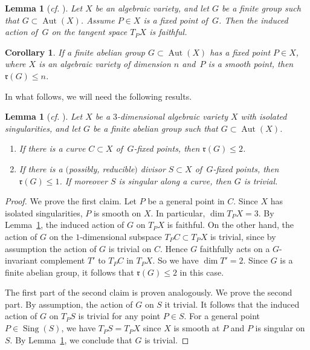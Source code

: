 \documentclass[10pt,a4paper]{article}
\newtheorem{corollary}[thm]{Corollary}
\newtheorem{lem}[thm]{Lemma}
\theoremstyle{definition}
\theoremstyle{remark}
\DeclareMathOperator{\Aut}{Aut}
\DeclareMathOperator{\Sing}{Sing}
\begin{document}
\begin{lem}[\textit{cf.} {\cite[Lemma 4]{Po14}}]
\label{lem-faithful-action}
Let $X$ be an algebraic variety, and let $G$ be a finite group such that $G\subset \Aut(X)$. Assume $P\in X$ is a fixed point of\, $G$.  Then the induced action of\, $G$ on the tangent space $T_P X$ is faithful.
\end{lem}

\begin{corollary}
\label{cor-faithful-action}
If a finite abelian group $G\subset \Aut(X)$ has a fixed point $P\in X$, where $X$ is an algebraic variety of dimension $n$ and~$P$ is a smooth point, then $\mathfrak{r}(G)\leq n$.
\end{corollary}

In what follows, we will need the following results. 

\begin{lem}[\textit{cf.} {\cite[Lemma 2.6]{Pr11}}]
\label{lem-fixed-curve-surface}
Let $X$ be a $3$-dimensional algebraic variety $X$ with isolated singularities, and let $G$ be a finite abelian group such that $G\subset \Aut(X)$.
\begin{enumerate}
\item\label{lfcs-1} 
If there is a curve $C\subset X$ of\, $G$-fixed points, then $\mathfrak{r}(G) \leq 2$.
\item\label{lfcs-2} 
If there is a $($possibly, reducible$)$ divisor $S\subset X$ of\, $G$-fixed points, then $\mathfrak{r}(G)\leq 1$.  If moreover $S$ is singular along a curve, then $G$ is trivial.
\end{enumerate}
\end{lem}

\begin{proof}
We prove the first claim. Let $P$ be a general point in $C$. Since $X$ has isolated singularities, $P$ is smooth on $X$. In particular, $\dim T_{P}X=3$. By Lemma~\ref{lem-faithful-action}, the induced action of $G$ on $T_{P}X$ is faithful. On the other hand, the action of $G$ on the $1$-dimensional subspace $T_P C \subset T_{P}X$ is trivial, since by assumption the action of $G$ is trivial on $C$. Hence $G$ faithfully acts on a $G$-invariant complement $T'$ to $T_P C$ in $T_P X$. So we have $\dim T'=2$. Since $G$ is a finite abelian group, it follows that $\mathfrak{r}(G)\leq 2$ in this case.  

The first part of the second claim is proven analogously. We prove the second part.  By assumption, the action of $G$ on $S$ it trivial. It follows that the induced action of $G$ on $T_P S$ is trivial for any point $P\in S$. For a general point $P\in \Sing(S)$, we have $T_P S=T_P X$ since $X$ is smooth at $P$ and $P$ is singular on $S$. By Lemma~\ref{lem-faithful-action}, we conclude that $G$ is trivial.
\end{proof}
\end{document}
